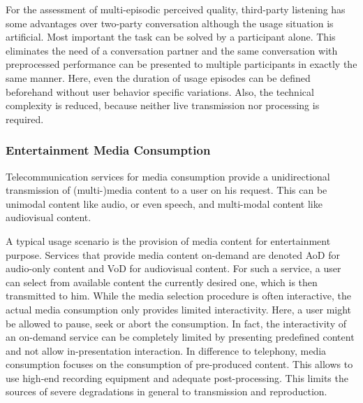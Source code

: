 For the assessment of multi-episodic perceived quality, third-party listening has some advantages over two-party conversation although the usage situation is artificial.
Most important the task can be solved by a participant alone.
This eliminates the need of a conversation partner and the same conversation with preprocessed performance can be presented to multiple participants in exactly the same manner.
Here, even the duration of usage episodes can be defined beforehand without user behavior specific variations.
Also, the technical complexity is reduced, because neither live transmission nor processing is required.

\subsubsection*{Entertainment Media Consumption}
Telecommunication services for media consumption provide a unidirectional transmission of (multi-)media content to a user on his request.
This can be unimodal content like audio, or even speech, and multi-modal content like audiovisual content.

A typical usage scenario is the provision of media content for entertainment purpose.
Services that provide media content on-demand are denoted \acf{AoD} for audio-only content and \acf{VoD} for audiovisual content.
For such a service, a user can select from available content the currently desired one, which is then transmitted to him.
While the media selection procedure is often interactive, the actual media consumption only provides limited interactivity.
Here, a user might be allowed to pause, seek or abort the consumption.
In fact, the interactivity of an on-demand service can be completely limited by presenting predefined content and not allow in-presentation interaction.
In difference to telephony, media consumption focuses on the consumption of pre-produced content.
This allows to use high-end recording equipment and adequate post-processing. %
This limits the sources of severe degradations in general to transmission and reproduction.


